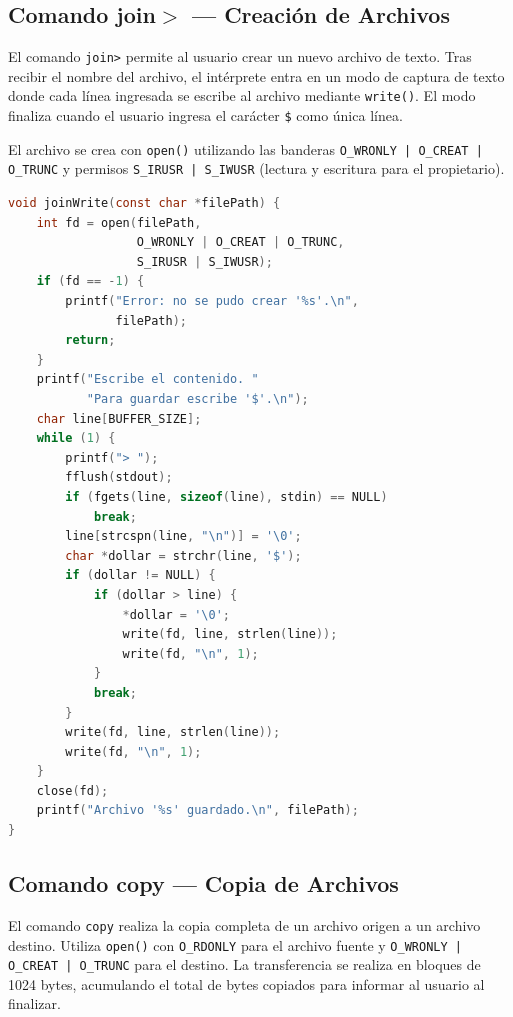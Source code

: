     \subsection{Comando join$>$ — Creación de Archivos}
        El comando \texttt{join>} permite al usuario crear un nuevo archivo de texto. Tras recibir el nombre del archivo, el intérprete entra en un modo de captura de texto donde cada línea ingresada se escribe al archivo mediante \texttt{write()}. El modo finaliza cuando el usuario ingresa el carácter \texttt{\$} como única línea.

        El archivo se crea con \texttt{open()} utilizando las banderas \texttt{O\_WRONLY | O\_CREAT | O\_TRUNC} y permisos \texttt{S\_IRUSR | S\_IWUSR} (lectura y escritura para el propietario).

        \begin{lstlisting}[language=C, caption={Comando join$>$ - Modo escritura}]
void joinWrite(const char *filePath) {
    int fd = open(filePath,
                  O_WRONLY | O_CREAT | O_TRUNC,
                  S_IRUSR | S_IWUSR);
    if (fd == -1) {
        printf("Error: no se pudo crear '%s'.\n",
               filePath);
        return;
    }
    printf("Escribe el contenido. "
           "Para guardar escribe '$'.\n");
    char line[BUFFER_SIZE];
    while (1) {
        printf("> ");
        fflush(stdout);
        if (fgets(line, sizeof(line), stdin) == NULL)
            break;
        line[strcspn(line, "\n")] = '\0';
        char *dollar = strchr(line, '$');
        if (dollar != NULL) {
            if (dollar > line) {
                *dollar = '\0';
                write(fd, line, strlen(line));
                write(fd, "\n", 1);
            }
            break;
        }
        write(fd, line, strlen(line));
        write(fd, "\n", 1);
    }
    close(fd);
    printf("Archivo '%s' guardado.\n", filePath);
}
        \end{lstlisting}

    \subsection{Comando copy — Copia de Archivos}
        El comando \texttt{copy} realiza la copia completa de un archivo origen a un archivo destino. Utiliza \texttt{open()} con \texttt{O\_RDONLY} para el archivo fuente y \texttt{O\_WRONLY | O\_CREAT | O\_TRUNC} para el destino. La transferencia se realiza en bloques de 1024 bytes, acumulando el total de bytes copiados para informar al usuario al finalizar.

